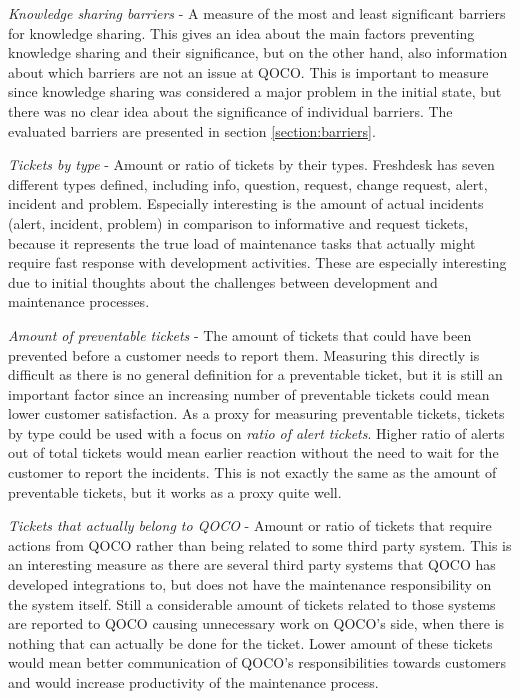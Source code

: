 \emph{Knowledge sharing barriers} - A measure of the most and least significant barriers for knowledge sharing. This gives an idea about the main factors preventing knowledge sharing
and their significance, but on the other hand, also information about which barriers are not an issue at QOCO. This is important to measure since knowledge sharing was considered a major
problem in the initial state, but there was no clear idea about the significance of individual barriers. The evaluated barriers are presented in section \ref{section:barriers}.

\emph{Tickets by type} - Amount or ratio of tickets by their types. Freshdesk has seven different types defined, including info, question, request, change request, alert, incident and problem.
Especially interesting is the amount of actual incidents (alert, incident, problem) in comparison to informative and request tickets, because it represents the true load of maintenance
tasks that actually might require fast response with development activities. These are especially interesting due to initial thoughts about the challenges between development and maintenance
processes.

\emph{Amount of preventable tickets} - The amount of tickets that could have been prevented before a customer needs to report them. Measuring this directly is difficult as there is no general
definition for a preventable ticket, but it is still an important factor since an increasing number of preventable tickets could mean lower customer satisfaction. As a proxy for measuring
preventable tickets, tickets by type could be used with a focus on \emph{ratio of alert tickets}. Higher ratio of alerts out of total tickets would mean earlier reaction without the need to wait
for the customer to report the incidents. This is not exactly the same as the amount of preventable tickets, but it works as a proxy quite well.

\emph{Tickets that actually belong to QOCO} - Amount or ratio of tickets that require actions from QOCO rather than being related to some third party system. This is an interesting measure
as there are several third party systems that QOCO has developed integrations to, but does not have the maintenance responsibility on the system itself. Still a considerable amount of tickets
related to those systems are reported to QOCO causing unnecessary work on QOCO's side, when there is nothing that can actually be done for the ticket. Lower amount of these tickets would mean
better communication of QOCO's responsibilities towards customers and would increase productivity of the maintenance process.

